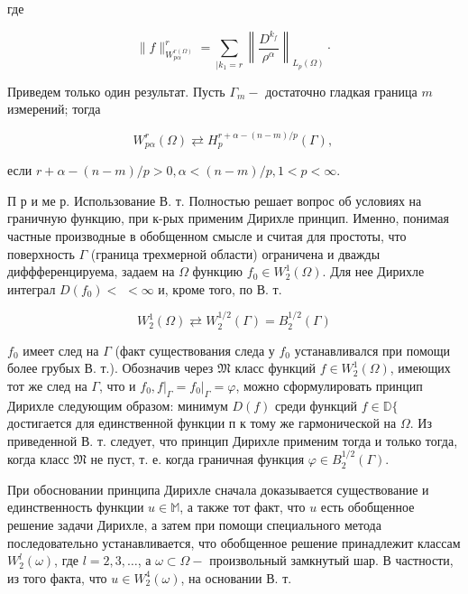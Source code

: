 \documentclass[10pt]{article}
\begin{document}
где



\[

\|f\|_{W_{p \alpha}^{r(\Omega)}}^{r}=\sum_{\mid k_{1}=r}\left\|\frac{D^{k_{f}}}{\rho^{\alpha}}\right\|_{L_{p}(\Omega)} \cdot

\]



Приведем только один результат. Пусть $\Gamma_{m}-$ достаточно гладкая граница $m$ измерений; тогда



\[

W_{p \alpha}^{r}(\Omega) \rightleftarrows H_{p}^{r+\alpha-(n-m) / p}(\Gamma) \text {, }

\]



если $r+\alpha-(n-m) / p>0, \alpha<(n-m) / p, 1<p<\infty$.



П р и ме р. Использование В. т. Полностью решает вопрос об условиях на граничную функцию, при к-рых применим Дирихле принцип. Именно, понимая частные производные в обобщенном смысле и считая для простоты, что поверхность $\Gamma$ (граница трехмерной области) ограничена и дважды диффференцируема, задаем на $\Omega$ функцию $f_{0} \in W_{2}^{1}(\Omega)$. Для нее Дирихле интеграл $D\left(f_{0}\right)<$ $<\infty$ и, кроме того, по В. т.



\[

W_{2}^{1}(\Omega) \rightleftarrows W_{2}^{1 / 2}(\Gamma)=B_{2}^{1 / 2}(\Gamma)

\]



$f_{0}$ имеет след на $\Gamma$ (факт существования следа у $f_{0}$ устанавливался при помощи более грубых В. т.). Обозначив через $\mathfrak{M}$ класс функций $f \in W_{2}^{1}(\Omega)$, имеющих тот же след на $\Gamma$, что и $f_{0},\left.f\right|_{\Gamma}=\left.f_{0}\right|_{\Gamma}=\varphi$, можно сформулировать принцип Дирихле следующим образом: минимум $D(f)$ среди функций $f \in \mathbb{D}\{$ достигается для единственной функции п к тому же гармонической на $\Omega$. Из приведенной В. т. следует, что принцип Дирихле применим тогда и только тогда, когда класс $\mathfrak{M}$ не пуст, т. е. когда граничная функция $\varphi \in B_{2}^{1 / 2}(\Gamma)$.



При обосновании принципа Дирихле сначала доказывается существование и единственность функции $u \in \mathbb{M}$, а также тот факт, что $u$ есть обобщенное решение задачи Дирихле, а затем при помощи специального метода последовательно устанавливается, что обобщенное решение принадлежит классам $W_{2}^{l}(\omega)$, где $l=2,3, \ldots$, а $\omega \subset \Omega-$ произвольный замкнутый шар. В частности, из того факта, что $u \in W_{2}^{4}(\omega)$, на основании В. т.
\end{document}
